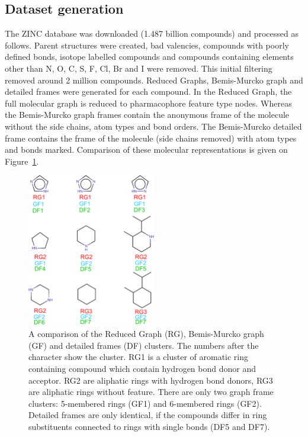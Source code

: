 \documentclass[journal=jacsat,manuscript=article]{achemso}
\begin{document}
\subsection{Dataset generation}

The ZINC database was downloaded (1.487 billion compounds)\cite{ZINC15,ZINC_db} and processed as follows. Parent structures were created, bad valencies, compounds with poorly defined bonds, isotope labelled compounds and compounds containing elements other than N, O, C, S, F, Cl, Br and I were removed. This initial filtering removed around 2 million compounds. Reduced Graphs\cite{RedGraph2003,RedGraph2004}, Bemis-Murcko graph and detailed frames\cite{BemisMurcko} were generated for each compound. In the Reduced Graph, the full molecular graph is reduced to pharmacophore feature type nodes. Whereas the Bemis-Murcko graph frames contain the anonymous frame of the molecule without the side chains, atom types and bond orders. The Bemis-Murcko detailed frame contains the frame of the molecule (side chains removed) with atom types and bonds marked. Comparison of these molecular representations is given on Figure~\ref{fig:GF_DF_RG}. 

\begin{figure}[hbtp]
\centering
\includegraphics[width=0.5\textwidth]{data/GFRGDF.pdf}
\caption{A comparison of the Reduced Graph (RG), Bemis-Murcko graph (GF) and detailed frames (DF) clusters. The numbers after the character show the cluster. RG1 is a cluster of aromatic ring containing compound which contain hydrogen bond donor and acceptor. RG2 are aliphatic rings with hydrogen bond donors, RG3 are aliphatic rings without feature. There are only two graph frame clusters: 5-membered rings (GF1) and 6-membered rings (GF2). Detailed frames are only identical, if the compounds differ in ring substituents connected to rings with single bonds (DF5 and DF7).}
\label{fig:GF_DF_RG}
\end{figure}
\end{document}
